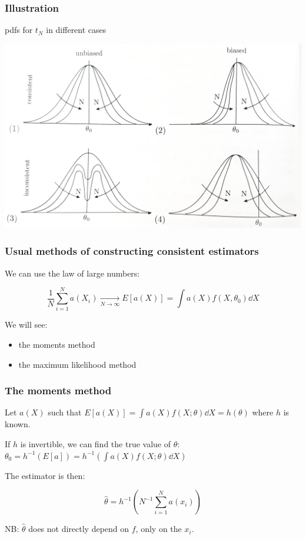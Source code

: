 \documentclass[9pt]{beamer}
\begin{document}
\begin{frame}
 \frametitle{Illustration}
 
 pdfs for $t_N$ in different cases
 
 \includegraphics[width=\textwidth]{estimators.jpg}
\end{frame}


\begin{frame}
 \frametitle{Usual methods of constructing consistent estimators}
 
 We can use the law of large numbers:
 
 $$\frac{1}{N} \sum_{i=1}^N a(X_i) \xrightarrow[N\to\infty]{} E[a(X)] = \int a(X)f(X,\theta_0)\dd X$$
 
 We will see:
 
 \begin{itemize}
  \item the moments method
  \item the maximum likelihood method
 \end{itemize}

 
\end{frame}

\begin{frame}
 \frametitle{The moments method}
 
 Let $a(X)$ such that $E[a(X)] = \int a(X) f(X;\theta) \dd X = h(\theta)$ where $h$ is known. 
 
 If $h$ is invertible, we can find the true value of $\theta$: 
 $\theta_0 = h^{-1}(E[a]) = h^{-1}\left(\int a(X) f(X;\theta) \dd X\right)$
 
 The estimator is then:
 
 $$\hat{\theta} = h^{-1} \left( N^{-1} \sum_{i=1}^N a(x_i) \right)$$
 
 NB: $\hat{\theta}$ does not directly depend on $f$, only on the $x_i$.
\end{frame}
\end{document}
